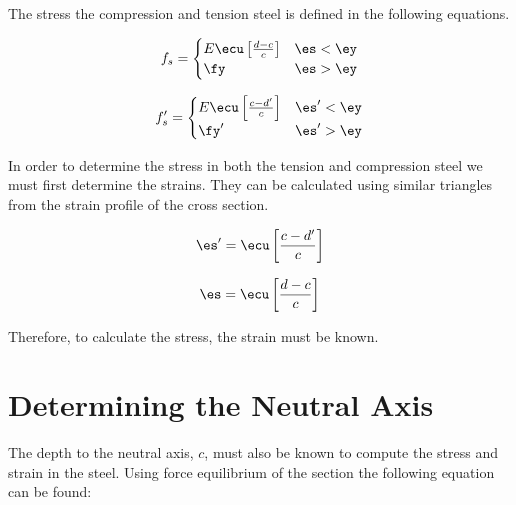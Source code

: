\documentclass[landscape, twocolumn, 12pt]{article}
\begin{document}
\begin{figure}[h]
\end{figure}

The stress the compression and tension steel is defined in the following equations.

\begin{align}
f_s =
  \begin{cases}
    E \ecu \left[\frac{d-c}{c}\right] & \es<\ey \\
    \fy                               & \es>\ey
  \end{cases}
\end{align}

\begin{align}
f'_s =
  \begin{cases}
    E \ecu \left[\frac{c-d'}{c}\right] & \es' < \ey \\
    \fy'                               & \es' > \ey
  \end{cases}
\end{align}


In order to determine the stress in both the tension and compression steel we must first determine the strains. They can be calculated using similar triangles from the strain profile of the cross section.

\begin{equation}
  \es' = \ecu \left[ \frac{c-d'}{c}\right]
\end{equation}

\begin{equation}
  \es = \ecu \left[ \frac{d-c}{c}\right]
\end{equation}


Therefore, to calculate the stress, the strain must be known.

\section{Determining the Neutral Axis}
The depth to the neutral axis, $c$, must also be known to compute the stress and strain in the steel. Using force equilibrium of the section the following equation can be found:
\end{document}
